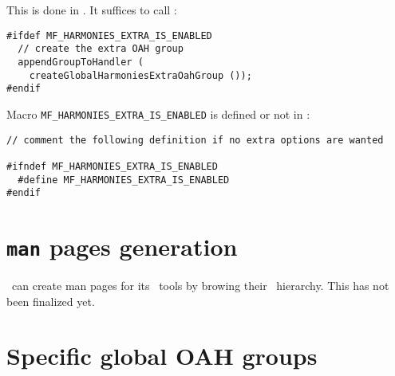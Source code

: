 This is done in . It suffices to call :
\begin{lstlisting}[language=CPlusPlus]
#ifdef MF_HARMONIES_EXTRA_IS_ENABLED
  // create the extra OAH group
  appendGroupToHandler (
    createGlobalHarmoniesExtraOahGroup ());
#endif
\end{lstlisting}

Macro {\tt MF_HARMONIES_EXTRA_IS_ENABLED} is defined or not in :
\begin{lstlisting}[language=CPlusPlus]
// comment the following definition if no extra options are wanted

#ifndef MF_HARMONIES_EXTRA_IS_ENABLED
  #define MF_HARMONIES_EXTRA_IS_ENABLED
#endif
\end{lstlisting}


%


\section{{\tt man} pages generation}

\mf\ can create man pages for its \CLI\ tools by browing their \oahRepr\ hierarchy. This has not been finalized yet.%


\section{Specific global OAH groups}

